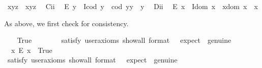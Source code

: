 \begin{isabellebody}
\ {\isachardoublequoteopen}x{\isasymcdot}{\isacharparenleft}y{\isasymcdot}z{\isacharparenright}\ {\isasymcong}\ {\isacharparenleft}x{\isasymcdot}y{\isacharparenright}{\isasymcdot}z{\isachardoublequoteclose}\ \isanewline
\ C\isactrlsub i\isactrlsub i{\isacharcolon}\ %
\ {\isachardoublequoteopen}E\ y\ \isactrlbold {\isasymrightarrow}\ {\isacharparenleft}I{\isacharparenleft}cod\ y{\isacharparenright}\ \isactrlbold {\isasymand}\ {\isacharparenleft}cod\ y{\isacharparenright}{\isasymcdot}y\ {\isasymcong}\ y{\isacharparenright}{\isachardoublequoteclose}\ \isanewline
\ D\isactrlsub i\isactrlsub i{\isacharcolon}\ %
\ {\isachardoublequoteopen}E\ x\ \isactrlbold {\isasymrightarrow}\ {\isacharparenleft}I{\isacharparenleft}dom\ x{\isacharparenright}\ \isactrlbold {\isasymand}\ x{\isasymcdot}{\isacharparenleft}dom\ x{\isacharparenright}\ {\isasymcong}\ x{\isacharparenright}{\isachardoublequoteclose}%
\begin{isamarkuptext}%
As above, we first check for consistency.%
\end{isamarkuptext}\isamarkuptrue%
\ \ \isamarkupfalse%
\ True\ \ %
\isanewline
\ \ \ \ \isamarkupfalse%
\ {\isacharbrackleft}satisfy{\isacharcomma}\ user{\isacharunderscore}axioms{\isacharcomma}\ show{\isacharunderscore}all{\isacharcomma}\ format\ {\isacharequal}\ {}{\isacharcomma}\ expect\ {\isacharequal}\ genuine{\isacharbrackright}%
\isadelimproof
\ %
\endisadelimproof
%
\isatagproof
{}\isamarkupfalse%
%
\endisatagproof
{\isafoldproof}%
%
\isadelimproof
%
\endisadelimproof
\isanewline
\ \ \isamarkupfalse%
\ \ {\isachardoublequoteopen}{\isasymexists}x{\isachardot}\ \isactrlbold {\isasymnot}{\isacharparenleft}E\ x{\isacharparenright}{\isachardoublequoteclose}\ \ True\ \ %
\ \ \isanewline
\ \ \ \ \isamarkupfalse%
\ {\isacharbrackleft}satisfy{\isacharcomma}\ user{\isacharunderscore}axioms{\isacharcomma}\ show{\isacharunderscore}all{\isacharcomma}\ format\ {\isacharequal}\ {}{\isacharcomma}\ expect\ {\isacharequal}\ genuine{\isacharbrackright}%
\isadelimproof
\ %
\endisadelimproof
%
\isatagproof
{}\isamarkupfalse%
%
\endisatagproof
{\isafoldproof}%
%
\isadelimproof
%
\endisadelimproof
\ \isanewline
\ \ \isamarkupfalse%

\end{isabellebody}
